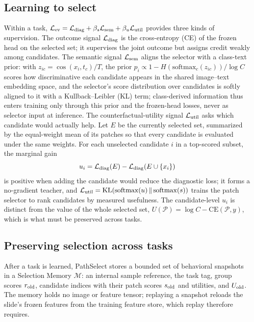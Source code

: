 \documentclass{article}
\def\L{{\cal L}}
\newcommand{\Psel}{\mathcal{P}}
\newcommand{\Mem}{\mathcal{M}}
\begin{document}
\subsection{Learning to select}
\label{ssec:within}

Within a task, $\L_{\mathrm{ev}}=\L_{\mathrm{diag}}+\beta_s\L_{\mathrm{sem}}+\beta_u\L_{\mathrm{util}}$ provides three kinds of supervision. The outcome signal $\L_{\mathrm{diag}}$ is the cross-entropy (CE) of the frozen head on the selected set; it supervises the joint outcome but assigns credit weakly among candidates. The semantic signal $\L_{\mathrm{sem}}$ aligns the selector with a class-text prior: with $z_{ic}=\cos(x_i,t_c)/T$, the prior $p_i\propto 1-H(\mathrm{softmax}_c(z_{ic}))/\log C$ scores how discriminative each candidate appears in the shared image--text embedding space, and the selector's score distribution over candidates is softly aligned to it with a Kullback--Leibler (KL) term; class-derived information thus enters training only through this prior and the frozen-head losses, never as selector input at inference. The counterfactual-utility signal $\L_{\mathrm{util}}$ asks which candidate would actually help. Let $E$ be the currently selected set, summarized by the equal-weight mean of its patches so that every candidate is evaluated under the same weights. For each unselected candidate $i$ in a top-scored subset, the marginal gain
\begin{equation}
u_i
=
\L_{\mathrm{diag}}(E)
-
\L_{\mathrm{diag}}(E\cup\{x_i\})
\label{eq:ui}
\end{equation}
is positive when adding the candidate would reduce the diagnostic loss; it forms a no-gradient teacher, and $\L_{\mathrm{util}}=\mathrm{KL}(\mathrm{softmax}(u)\,\Vert\,\mathrm{softmax}(s))$ trains the patch selector to rank candidates by measured usefulness. The candidate-level $u_i$ is distinct from the value of the whole selected set, $U(\Psel)=\log C-\mathrm{CE}(\Psel,y)$, which is what must be preserved across tasks.

\subsection{Preserving selection across tasks}
\label{ssec:cl}

After a task is learned, PathSelect stores a bounded set of behavioral snapshots in a Selection Memory $\Mem$: an internal sample reference, the task tag, group scores $r_{\rm old}$, candidate indices with their patch scores $s_{\rm old}$ and utilities, and $U_{\rm old}$. The memory holds no image or feature tensor; replaying a snapshot reloads the slide's frozen features from the training feature store, which replay therefore requires.
\end{document}
